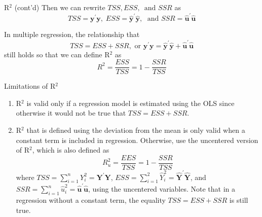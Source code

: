 \documentclass[presentation,10pt]{beamer}
\begin{document}
\begin{frame}[plain,label={sec:org6aefa4e}]{R\(^{\text{2}}\) (cont'd)}
Then we can rewrite
\(TSS, ESS,\, \text{ and } SSR\) as
\[ TSS = \mathbf{y}^{\prime} \mathbf{y},\; ESS =
\hat{\mathbf{y}}^{\prime} \hat{\mathbf{y}},\; \text{ and } SSR =
\hat{\mathbf{u}}^{\prime} \hat{\mathbf{u}} \]

In multiple regression, the relationship that
\[ TSS = ESS + SSR, \text{ or } \mathbf{y}^{\prime} \mathbf{y} =
\hat{\mathbf{y}}^{\prime} \hat{\mathbf{y}} + \hat{\mathbf{u}}^{\prime}
\hat{\mathbf{u}}\]
still holds so that we can define R\(^{\text{2}}\) as
\begin{equation}
\label{eq:r2-center}
R^2 = \frac{ESS}{TSS} = 1 - \frac{SSR}{TSS}
\end{equation}
\end{frame}

\begin{frame}[label={sec:orge859e84}]{Limitations of R\(^{\text{2}}\)}
\begin{enumerate}
\item R\(^{\text{2}}\) is valid only if a regression model is estimated using the OLS
since otherwise it would not be true that \(TSS = ESS + SSR\).
\item R\(^{\text{2}}\) that is defined using the deviation from the mean is only valid
when a constant term is included in regression. Otherwise, use the
uncentered version of R\(^{\text{2}}\), which is also defined as
\begin{equation}
\label{eq:r2-uncenter}
R^2_u = \frac{EES}{TSS} = 1 - \frac{SSR}{TSS}
\end{equation}
where \(TSS = \sum_{i=1}^n Y_i^2 = \mathbf{Y}^{\prime} \mathbf{Y}\),
\(ESS = \sum_{i=1}^2 \hat{Y}_i^2 = \hat{\mathbf{Y}}^{\prime}
   \hat{\mathbf{Y}}\), and \(SSR = \sum_{i=1}^n \hat{u}_i^2 =
   \hat{\mathbf{u}}^{\prime} \hat{\mathbf{u}}\), using the uncentered
variables.  Note that in a regression without a constant term, the
equality \(TSS = ESS + SSR\) is still true.
\end{enumerate}
\end{frame}
\end{document}
